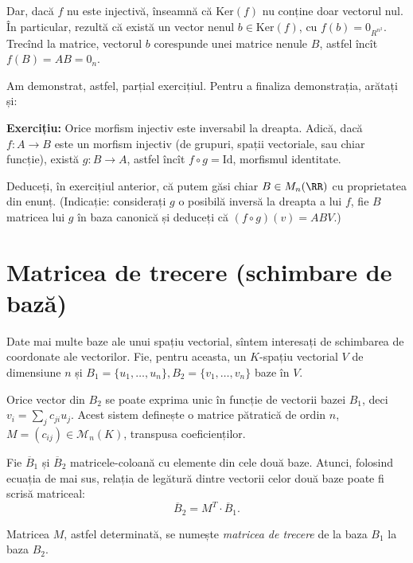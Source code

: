 Dar, dacă $f$ nu este injectivă, înseamnă că $\mathrm{Ker}(f)$ nu conține doar
vectorul nul. În particular, rezultă că există un vector nenul $b \in \mathrm{Ker}(f)$,
cu $f(b) = 0_{R^{n^2}}$. Trecînd la matrice, vectorul $b$ corespunde unei matrice nenule $B$,
astfel încît $f(B) = AB = 0_n$.

\vspace{1cm}

Am demonstrat, astfel, parțial exercițiul. Pentru a finaliza demonstrația, arătați și:

\textbf{Exercițiu:} Orice morfism injectiv este inversabil la dreapta. Adică,
dacă $f : A \to B$ este un morfism injectiv (de grupuri, spații vectoriale, sau chiar funcție),
există $g : B \to A$, astfel încît $f \circ g = \mathrm{Id}$, morfismul identitate.

Deduceți, în exercițiul anterior, că putem găsi chiar $B \in M_n(\RR)$ cu proprietatea
din enunț. (Indicație: considerați $g$ o posibilă inversă la dreapta a lui $f$, fie $B$
matricea lui $g$ în baza canonică și deduceți că $(f \circ g)(v) = ABV$.)



\section{Matricea de trecere (schimbare de bază)}
\label{sec:matrice-trecere}
Date mai multe baze ale unui spațiu vectorial, sîntem interesați de schimbarea
de coordonate ale vectorilor. Fie, pentru aceasta, un $K$-spațiu vectorial 
$V$ de dimensiune $n$ și $B_1 = \{u_1, \dots, u_n\}, B_2 = \{v_1,\dots,v_n\}$ 
baze în $V$.

Orice vector din $B_2$ se poate exprima unic în funcție de vectorii bazei $B_1$, 
deci $v_i = \sum_j c_{ji} u_j$. Acest sistem definește o matrice pătratică de 
ordin $n$, $M = (c_{ij}) \in \mathcal{M}_n(K)$, transpusa coeficienților.

Fie $\overline{B}_1$ și $\overline{B}_2$ matricele-coloană cu elemente din cele 
două baze. Atunci, folosind ecuația de mai sus, relația de legătură dintre 
vectorii celor două baze poate fi scrisă matriceal: 
\[
\overline{B}_2 = M^T \cdot \overline{B}_1.
\]

\begin{definition}
Matricea $M$, astfel determinată, se numește \emph{matricea de trecere} de la 
baza $B_1$ la baza $B_2$.
\end{definition}

